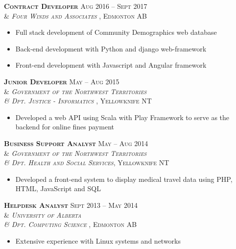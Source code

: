 \documentclass[10pt]{article} %
\begin{document}
\begin{minipage}[t]{0.52\textwidth}

{\raggedright\textsc{\textbf{Contract Developer} \hfill Aug 2016 -- Sept 2017\\
& \textit{Four Winds and Associates }, Edmonton AB}} 
\begin{itemize}
\item Full stack development of Community Demographics web database 
\item Back-end development with Python and django web-framework
\item Front-end development with Javascript and Angular framework
\end{itemize} 


{\raggedright\textsc{\textbf{Junior Developer} \hfill May -- Aug 2015\\
& \textit{Government of the Northwest Territories \\
& Dpt. Justice - Informatics }, Yellowknife NT}}
\begin{itemize}
\item Developed a web API using Scala with Play Framework to serve as the backend for online fines payment
\end{itemize}


{\raggedright\textsc{\textbf{Business Support Analyst} \hfill May -- Aug 2014\\
& \textit{Government of the Northwest Territories \\
& Dpt. Health and Social Services}, Yellowknife NT}}
\begin{itemize}
\item Developed a front-end system to display medical travel data using PHP, HTML, JavaScript and SQL
\end{itemize}


{\raggedright\textsc{\textbf{Helpdesk Analyst} \hfill \textsc{Sept 2013 -- May 2014} \\
& \textit{University of Alberta \\
& Dpt. Computing Science }, Edmonton AB}}
\begin{itemize}
\item Extensive experience with Linux systems and networks
\end{itemize} 




	
\end{minipage} %
\end{document}

